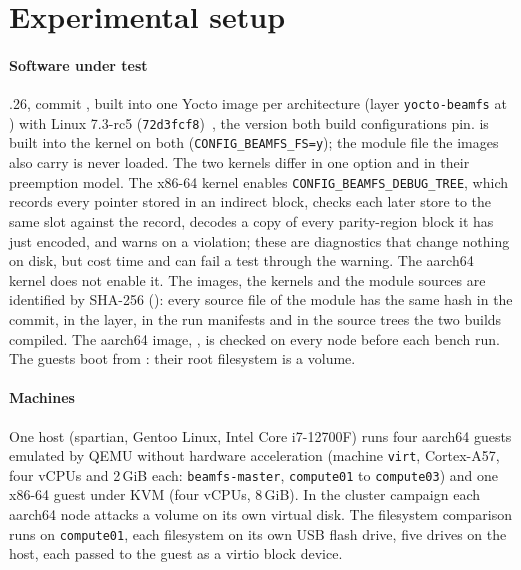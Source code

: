 \section{Experimental setup}\label{sec:setup}

\paragraph*{Software under test}
.26, commit \texttt{\commitBeamfs}, built into one Yocto image
per architecture (layer \texttt{yocto-beamfs} at \texttt{\commitYocto})
with Linux 7.3-rc5 (\texttt{72d3fcf8})~\cite{linux73rc5}, the version
both build configurations pin. \bfs is built into the kernel on both
(\texttt{CONFIG\_BEAMFS\_FS=y}); the module file the images also carry
is never loaded. The two kernels differ in one \bfs option and in their
preemption model. The x86-64 kernel enables
\texttt{CONFIG\_BEAMFS\_DEBUG\_TREE}, which records every pointer stored
in an indirect block, checks each later store to the same slot against
the record, decodes a copy of every parity-region block it has just
encoded, and warns on a violation; these are diagnostics that change
nothing on disk, but cost time and can fail a test through the warning.
The aarch64 kernel does not enable it. The images, the kernels and the
module sources are identified by SHA-256 (\apprepro): every source file
of the module has the same hash in the commit, in the layer, in the run
manifests and in the \srcTrees{} source trees the two builds compiled.
The aarch64 image, \hash{\imageSha}, is checked on every node before each
bench run. The guests boot from \bfs: their root filesystem is a \bfs
volume.

\paragraph*{Machines}
One host (spartian, Gentoo Linux, Intel Core i7-12700F) runs four
aarch64 guests emulated by QEMU without hardware acceleration (machine
\texttt{virt}, Cortex-A57, four vCPUs and 2\,GiB each:
\texttt{beamfs-master}, \texttt{compute01} to \texttt{compute03}) and one
x86-64 guest under KVM (four vCPUs, 8\,GiB). In the cluster campaign each aarch64 node attacks a \bfs
volume on its own virtual disk. The filesystem comparison runs on
\texttt{compute01}, each filesystem on its own USB flash drive,
five drives on the host, each passed to the guest as a virtio block
device.

